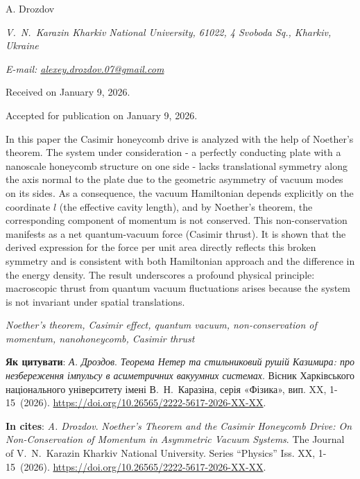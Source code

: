\documentclass[twoside, 10pt]{article}
\makeatletter
\def\myfirstpage{1}
\def\mylastpage{15}
\def\mypages{\myfirstpage-\mylastpage}
\def\myname{A. Drozdov}
\def\mynameukr{А. Дроздов}
\def\mytitle{Noether's Theorem and the Casimir Honeycomb Drive: On Non-Conservation of Momentum in Asymmetric Vacuum Systems}
\def\mytitleukr{Теорема Нетер та стильниковий рушій Казимира: про незбереження імпульсу в асиметричних вакуумних системах}
\def\mydoi{10.26565/2222-5617-2026-XX-XX} %
\def\myemail{alexey.drozdov.07@gmail.com}
\def\ukrvisnyk{Вісник Харківського національного університету імені В.~Н.~Каразіна, серія «Фізика», вип. XX, \mypages~(2026)}
\def\envisnyk{The Journal of V.~N.~Karazin Kharkiv National University. Series “Physics” Iss. XX, \mypages~(2026)}
\def\myworkplace{V.~N.~Karazin Kharkiv National University, 61022, 4 Svoboda Sq., Kharkiv, Ukraine}
\def\myorcidlink{0009-0004-1386-4534}
\def\myreceived{Received on January 9, 2026.}
\def\myaccepted{Accepted for publication on January 9, 2026.}
\makeatother
\begin{document}
\vspace{7mm}
\centerline{\Large{\myname \,\orcidlink{\myorcidlink} }}
\vspace{7.5mm}
\centerline{\textit{\myworkplace}}
\centerline{\textit{E-mail: \href{mailto:\myemail}{\myemail}}}

\vspace{5mm}
\centerline{\myreceived}
\centerline{\myaccepted}

\vspace{5mm}

In this paper the Casimir honeycomb drive is analyzed with the help of Noether’s theorem.
The system under consideration - a perfectly conducting plate with a nanoscale honeycomb structure
on one side - lacks translational symmetry along the axis normal to the plate
due to the geometric asymmetry of vacuum modes on its sides.
As a consequence, the vacuum Hamiltonian depends explicitly
on the coordinate \(l\) (the effective cavity length), and by Noether’s theorem,
the corresponding component of momentum is not conserved.
This non-conservation manifests as a net quantum-vacuum force (Casimir thrust).
It is shown that the derived expression for the force per unit area directly reflects this broken symmetry
and is consistent with both Hamiltonian approach and the difference in the energy density.
The result underscores a profound physical principle: macroscopic thrust from quantum vacuum fluctuations
arises because the system is not invariant under spatial translations.

\vspace{5mm}

\noindent
\begin{keywords}
\textit{Noether’s theorem, Casimir effect, quantum vacuum, non-conservation of momentum, nanohoneycomb, Casimir thrust}
\end{keywords}

\vspace{5mm}

\selectfont

\noindent
\textbf{Як цитувати}: \textit{\mynameukr}. \textit{\mytitleukr}. {\ukrvisnyk}. \href{https://doi.org/\mydoi} {https://doi.org/\mydoi}.

\vspace{5mm}

\selectfont

\noindent
\textbf{In cites}: \textit{\myname}. \textit{\mytitle}. {\envisnyk}. \href{https://doi.org/\mydoi} {https://doi.org/\mydoi}.
\end{document}
